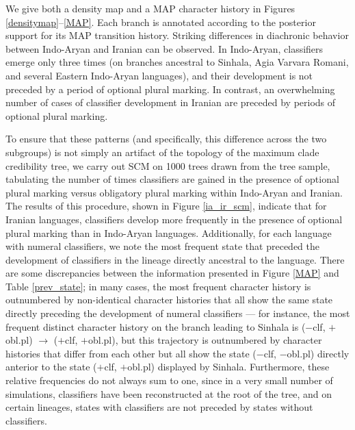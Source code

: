 \documentclass[11pt]{article}
\begin{document}
We give both a density map and a MAP character history in Figures \ref{densitymap}--\ref{MAP}. Each branch is annotated according to the posterior support for its MAP transition history. 
Striking differences in diachronic behavior between Indo-Aryan and Iranian can be observed. %
In Indo-Aryan, classifiers emerge only three times (on branches ancestral to Sinhala, Agia Varvara Romani, and several Eastern Indo-Aryan languages), and their development is not preceded by a period of optional plural marking. 
In contrast, an overwhelming number of cases of classifier development in Iranian are preceded by periods of optional plural marking. 

To ensure that these patterns (and specifically, this difference across the two subgroups) is not simply an artifact of the topology of the maximum clade credibility tree, we carry out SCM on 1000 trees drawn from the tree sample, tabulating the number of times classifiers are gained in the presence of optional plural marking versus obligatory plural marking within Indo-Aryan and Iranian. 
The results of this procedure, shown in Figure \ref{ia_ir_scm}, indicate that for Iranian languages, classifiers develop more frequently in the presence of optional plural marking than in Indo-Aryan languages. 
Additionally, for each language with numeral classifiers, we note the most frequent state that preceded the development of classifiers in the lineage directly ancestral to the language. 
There are some discrepancies between the information presented in Figure \ref{MAP} and Table \ref{prev_state}; in many cases, the most frequent character history is outnumbered by non-identical character histories that all show the same state directly preceding the development of numeral classifiers --- for instance, the most frequent distinct character history on the branch leading to Sinhala is ($-${\sc clf}, $+${\sc obl.pl}) $\rightarrow$ ($+${\sc clf}, $+${\sc obl.pl}), but this trajectory is outnumbered by character histories that differ from each other but all show the state ($-${\sc clf}, $-${\sc obl.pl}) directly anterior to the state ($+${\sc clf}, $+${\sc obl.pl}) displayed by Sinhala. 
Furthermore, these relative frequencies do not always sum to one, since in a very small number of simulations, classifiers have been reconstructed at the root of the tree, and 
on certain lineages, states with classifiers are not preceded by states without classifiers. 
\end{document}
